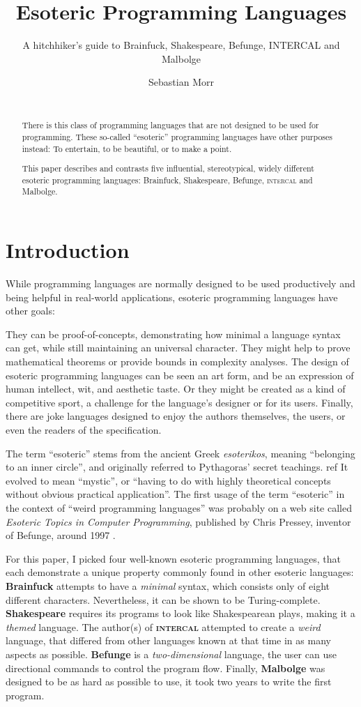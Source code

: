 \documentclass{sig-alternate}
\title{Esoteric Programming Languages}
\subtitle{A hitchhiker's guide to Brainfuck, Shakespeare, Befunge, INTERCAL and Malbolge}
\author{\alignauthor Sebastian Morr\\\affaddr{Technical University Braunschweig}\\\email{sebastian@morr.cc}}
\newcommand{\ic}{\textsc{intercal}}
\begin{document}
\maketitle

\begin{abstract}
    There is this class of programming languages that are not designed to be used for programming. These so-called “esoteric” programming languages have other purposes instead: To entertain, to be beautiful, or to make a point.

    This paper describes and contrasts five influential, stereotypical, widely different esoteric programming languages: Brainfuck, Shakespeare, Befunge, \ic{} and Malbolge.
\end{abstract}

\section{Introduction}
\label{introduction}

While programming languages are normally designed to be used productively and being helpful in real-world applications, esoteric programming languages have other goals:

They can be proof-of-concepts, demonstrating how minimal a language syntax can get, while still maintaining an universal character. They might help to prove mathematical theorems or provide bounds in complexity analyses. The design of esoteric programming languages can be seen an art form, and be an expression of human intellect, wit, and aesthetic taste. Or they might be created as a kind of competitive sport, a challenge for the language's designer or for its users. Finally, there are joke languages designed to enjoy the authors themselves, the users, or even the readers of the specification.

The term “esoteric” stems from the ancient Greek \emph{esoterikos}, meaning “belonging to an inner circle”, and originally referred to Pythagoras' secret teachings. ref It evolved to mean “mystic”, or “having to do with highly theoretical concepts without obvious practical application”. The first usage of the term “esoteric” in the context of “weird programming languages” was probably on a web site called \emph{Esoteric Topics in Computer Programming}, published by Chris Pressey, inventor of Befunge, around 1997 \cite{pressey2005chris}.

For this paper, I picked four well-known esoteric programming languages, that each demonstrate a unique property commonly found in other esoteric languages: \textbf{Brainfuck} attempts to have a \textit{minimal} syntax, which consists only of eight different characters. Nevertheless, it can be shown to be Turing-complete. \textbf{Shakespeare} requires its programs to look like Shakespearean plays, making it a \textit{themed} language. The author(s) of \textbf{\ic{}} attempted to create a \textit{weird} language, that differed from other languages known at that time in as many aspects as possible. \textbf{Befunge} is a \textit{two-dimensional} language, the user can use directional commands to control the program flow. Finally, \textbf{Malbolge} was designed to be as hard as possible to use, it took two years to write the first program.
\end{document}
